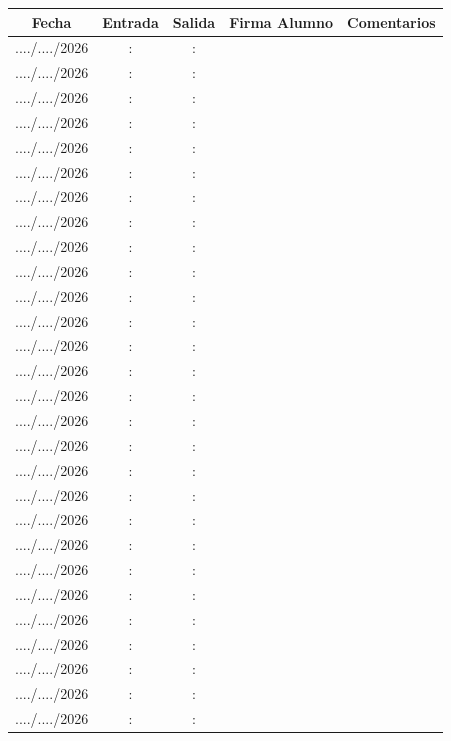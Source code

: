\documentclass[../main]{subfiles}
\begin{document}
\begin{table}[h]
    \centering
    \begin{tabular}{|c|c|c|p{5cm}|p{5cm}|} \hline 
         Fecha& Entrada &Salida & Firma Alumno& Comentarios  \\\hline \hline
       ..../..../2026 & : & : & & \\ \hline
       ..../..../2026 & : & : & & \\ \hline
       ..../..../2026 & : & : & & \\ \hline
       ..../..../2026 & : & : & & \\ \hline
       ..../..../2026 & : & : & & \\ \hline
       ..../..../2026 & : & : & & \\ \hline
       ..../..../2026 & : & : & & \\ \hline
       ..../..../2026 & : & : & & \\ \hline
       ..../..../2026 & : & : & & \\ \hline
       ..../..../2026 & : & : & & \\ \hline
       ..../..../2026 & : & : & & \\ \hline
       ..../..../2026 & : & : & & \\ \hline
       ..../..../2026 & : & : & & \\ \hline
       ..../..../2026 & : & : & & \\ \hline
       ..../..../2026 & : & : & & \\ \hline
       ..../..../2026 & : & : & & \\ \hline
       ..../..../2026 & : & : & & \\ \hline
       ..../..../2026 & : & : & & \\ \hline
       ..../..../2026 & : & : & & \\ \hline
       ..../..../2026 & : & : & & \\ \hline
       ..../..../2026 & : & : & & \\ \hline
       ..../..../2026 & : & : & & \\ \hline
       ..../..../2026 & : & : & & \\ \hline
       ..../..../2026 & : & : & & \\ \hline
       ..../..../2026 & : & : & & \\ \hline
       ..../..../2026 & : & : & & \\ \hline
       ..../..../2026 & : & : & & \\ \hline
       ..../..../2026 & : & : & & \\ \hline
 
      
    
    \end{tabular}
\end{table}
\end{document}
